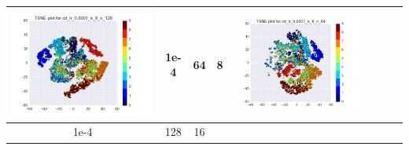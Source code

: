 \documentclass[12pt]{report}
\begin{document}
\begin{table}[H]
\begin{tabular}{ | c | c | c | c || c | c | c| c |}
\begin{minipage}{.3\textwidth}
      \includegraphics[scale=0.25]{cd_lr_0_0001_k_8_n_128.png}
    \end{minipage}
	&
    1e-4 & 64 & 8 &
    \begin{minipage}{.3\textwidth}
      \includegraphics[scale=0.25]{cd_lr_0_0001_k_8_n_64.png}
    \end{minipage}
    \\ \hline
        1e-4 & 128 & 16 &
    \begin{minipage}{.3\textwidth}

\end{minipage}
\end{tabular}
\end{table}
\end{document}
